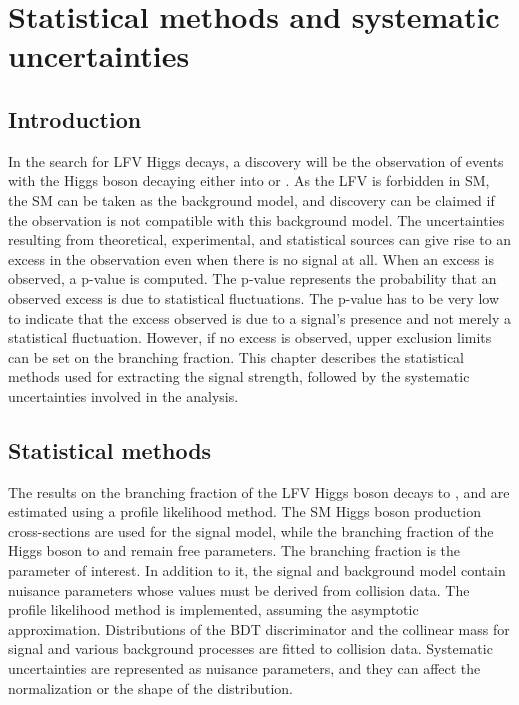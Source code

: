 %
%

\chapter{Statistical methods and systematic uncertainties}
\label{syst_unc}

\section{Introduction}
In the search for LFV Higgs decays, a discovery will be the observation of events with the Higgs boson decaying either into \mutau or \etau. As the LFV is forbidden in SM, the SM can be taken as the background model, and discovery can be claimed if the observation is not compatible with this background model. The uncertainties resulting from theoretical, experimental, and statistical sources can give rise to an excess in the observation even when there is no signal at all. When an excess is observed, a p-value is computed. The p-value represents the probability that an observed excess is due to statistical fluctuations. The p-value has to be very low to indicate that the excess observed is due to a signal's presence and not merely a statistical fluctuation. However, if no excess is observed, upper exclusion limits can be set on the branching fraction. This chapter describes the statistical methods used for extracting the signal strength, followed by the systematic uncertainties involved in the analysis.

\section{Statistical methods}
\label{stat_meth}

The results on the branching fraction of the LFV Higgs boson decays to \mutau, and \etau are estimated using a profile likelihood method. The SM Higgs boson production cross-sections are used for the signal model, while the branching fraction of the Higgs boson to \mutau and \etau remain free parameters. The branching fraction is the parameter of interest. In addition to it, the signal and background model contain nuisance parameters whose values must be derived from collision data. The profile likelihood method is implemented, assuming the asymptotic approximation. Distributions of the BDT discriminator and the collinear mass for signal and various background processes are fitted to collision data. Systematic uncertainties are represented as nuisance parameters, and they can affect the normalization or the shape of the distribution.

